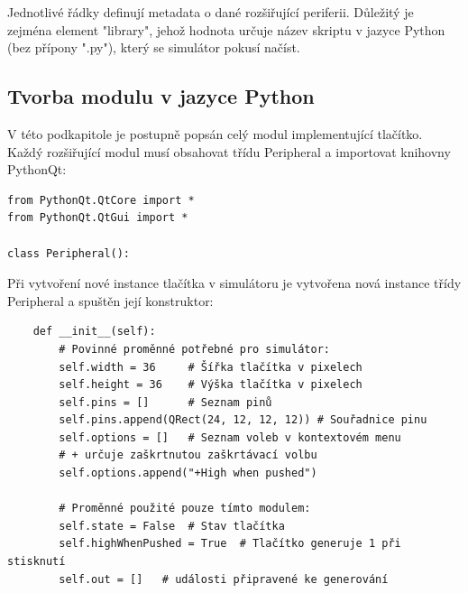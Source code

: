 Jednotlivé řádky definují metadata o dané rozšiřující periferii. Důležitý je zejména element "library", jehož hodnota určuje název skriptu v jazyce Python (bez přípony ".py"), který se simulátor pokusí načíst.

\subsection{Tvorba modulu v jazyce Python}

V této podkapitole je postupně popsán celý modul implementující tlačítko. Každý rozšiřující modul musí obsahovat třídu Peripheral a importovat knihovny PythonQt:

\begin{lstlisting}
from PythonQt.QtCore import *
from PythonQt.QtGui import *

class Peripheral():
\end{lstlisting}

Při vytvoření nové instance tlačítka v simulátoru je vytvořena nová instance třídy Peripheral a spuštěn její konstruktor:

\begin{lstlisting}
	def __init__(self):
		# Povinné proměnné potřebné pro simulátor:
		self.width = 36		# Šířka tlačítka v pixelech
		self.height = 36	# Výška tlačítka v pixelech
		self.pins = []		# Seznam pinů
		self.pins.append(QRect(24, 12, 12, 12))	# Souřadnice pinu
		self.options = []	# Seznam voleb v kontextovém menu
		# + určuje zaškrtnutou zaškrtávací volbu
		self.options.append("+High when pushed")

		# Proměnné použité pouze tímto modulem:
		self.state = False	# Stav tlačítka
		self.highWhenPushed = True	# Tlačítko generuje 1 při stisknutí
		self.out = []	# události připravené ke generování
\end{lstlisting}

